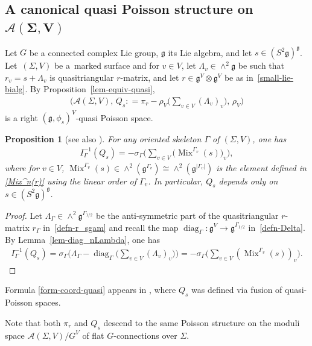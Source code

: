 \documentclass[pdftex]{sigma}
\numberwithin{equation}{section}
\newtheorem{Proposition}[Theorem]{Proposition}
{ \theoremstyle{definition}
\newtheorem{Definition}[Theorem]{Definition}
\newtheorem{Example}[Theorem]{Example}
\newtheorem{Remark}[Theorem]{Remark} }
\def \g {\mathfrak{a}}
\def \g {\mathfrak{g}}
\def \A {{\mathcal{A}}}
\DeclareMathOperator{\diag}{diag}
\DeclareMathOperator{\Mix}{Mix}
\def \sV {{\scriptscriptstyle V}}
\def \sGam {{\scriptscriptstyle \Gamma}}
\begin{document}
\subsection[A canonical quasi Poisson structure on $\A(\Sigma, V)$]{A canonical quasi Poisson structure on $\boldsymbol{\A(\Sigma, V)}$} \label{subsec-quasip}

Let $G$ be a connected complex Lie group, $\g$ its Lie algebra, and let $s \in (S^2\g)^\g$. Let~$(\Sigma, V)$ be a~marked surface and for $v \in V$, let $\Lambda_v \in \wedge^2 \g$ be such that $r_v = s + \Lambda_v$ is quasitriangular $r$-matrix, and let $r \in \g^{\sV} \otimes \g^{\sV}$ be as in~\eqref{small-lie-bialg}. By Proposition~\ref{lem-equiv-quasi},
\begin{gather*}
\bigg(\A(\Sigma, V), \, Q_s: = \pi_r - \rho_{\sV} \bigg( \sum_{v \in V} (\Lambda_v)_v \bigg), \, \rho_{\sV} \bigg)
\end{gather*}
is a right $(\g, \phi_s)^{\sV}$-quasi Poisson space.

\begin{Proposition}[see also \cite{LBS1}] \label{coord-quasi}
For any oriented skeleton $\Gamma$ of $(\Sigma, V)$, one has
\begin{gather}
I_\Gamma^{-1}(Q_s) = -\sigma_{\sGam} \bigg( \sum_{v \in V} \big(\Mix^{\sGam_v}(s)\big)_v \bigg), \label{form-coord-quasi}
\end{gather}
where for $v \in V$, $\Mix^{\sGam_v}(s) \in \wedge^2 (\g^{\sGam_v}) \cong \wedge^2 (\g^{|\sGam_v |})$ is the element defined in \eqref{Mix^n(r)} using the linear order of $\Gamma_v$. In particular, $Q_s$ depends only on $s \in (S^2\g)^\g$.
\end{Proposition}
\begin{proof} Let $\Lambda_\sGam \in \wedge^2 \g^{\sGam_{1/2}}$ be the anti-symmetric part of the quasitriangular $r$-matrix $r_\sGam$ in~\eqref{defn-r_sgam} and recall the map $\diag_\sGam\colon \g^\sV \to \g^{\sGam_{1/2}}$ in~\eqref{defn-Delta}. By Lemma~\ref{lem-diag_nLambda}, one has
\begin{gather*}
I_\Gamma^{-1}(Q_s) = \sigma_{\sGam} \bigg( \Lambda_\sGam - \diag_{\sGam} \bigg(\sum_{v \in V} (\Lambda_v)_v \bigg) \bigg) = -\sigma_{\sGam} \bigg( \sum_{v \in V} (\Mix^{\sGam_v}(s))_v \bigg).\tag*{\qed}
\end{gather*}\renewcommand{\qed}{}
\end{proof}

\begin{Remark} Formula \eqref{form-coord-quasi} appears in \cite[Section~4]{LBS1}, where $Q_s$ was def\/ined via fusion of quasi-Poisson spaces.

Note that both $\pi_r$ and $Q_s$ descend to the same Poisson structure on the moduli space $\A(\Sigma, V)/G^V$ of f\/lat $G$-connections over $\Sigma$.
\end{Remark}
\end{document}
